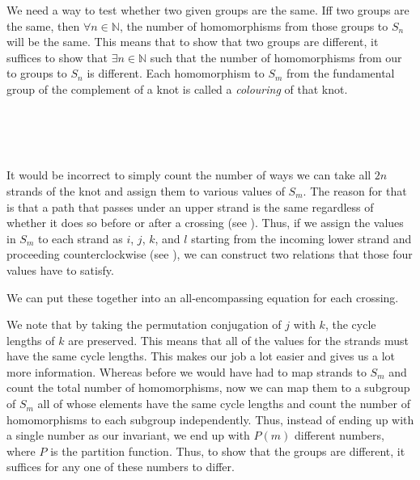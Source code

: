 \begin{paper}
We need a way to test whether two given groups are the same.
Iff two groups are the same, then $\forall n\in\mathbb N$, the number of
homomorphisms from those groups to $S_n$ will be the same.
This means that to show that two groups are different, it suffices to show that
$\exists n\in\mathbb N$ such that the number of homomorphisms from our to groups
to $S_n$ is different.
Each homomorphism to $S_m$ from the fundamental group of the complement of a
knot is called a \textit{colouring} of that knot.

\\

\vspace{-4.5em}\hspace{15ex}{\fontsize{20pt}{1em}\selectfont$\equiv$}\\

\vspace{-5em}\hfill{}\\


It would be incorrect to simply count the number of ways we can take all $2n$
strands of the knot and assign them to various values of $S_m$.
The reason for that is that a path that passes under an upper strand is the same
regardless of whether it does so before or after a crossing (see \figPasses).
Thus, if we assign the values in $S_m$ to each strand as $i$, $j$, $k$, and $l$
starting from the incoming lower strand and proceeding counterclockwise (see
\figX), we can construct two relations that those four values have to
satisfy.


We can put these together into an all-encompassing equation for each crossing.



We note that by taking the permutation conjugation of $j$ with $k$, the cycle
lengths of $k$ are preserved.
This means that all of the values for the strands must have the same cycle
lengths.
This makes our job a lot easier and gives us a lot more information.
Whereas before we would have had to map strands to $S_m$ and count the total
number of homomorphisms, now we can map them to a subgroup of $S_m$ all of whose
elements have the same cycle lengths and count the number of homomorphisms to
each subgroup independently.
Thus, instead of ending up with a single number as our invariant, we end up with
$P(m)$ different numbers, where $P$ is the partition function.
Thus, to show that the groups are different, it suffices for any one of these
numbers to differ.


\end{paper}
